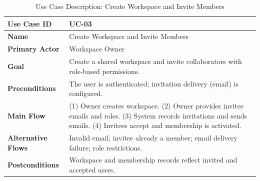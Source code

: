 \begin{table}[H]
    \centering
    \small
    \begin{tabularx}{\textwidth}{|l|X|}
        \hline
        \textbf{Use Case ID}       & UC-03                                                                                                                                                                       \\
        \hline
        \textbf{Name}              & Create Workspace and Invite Members                                                                                                                                         \\
        \hline
        \textbf{Primary Actor}     & Workspace Owner                                                                                                                                                             \\
        \hline
        \textbf{Goal}              & Create a shared workspace and invite collaborators with role-based permissions.                                                                                             \\
        \hline
        \textbf{Preconditions}     & The user is authenticated; invitation delivery (email) is configured.                                                                                                       \\
        \hline
        \textbf{Main Flow}         & (1) Owner creates workspace. (2) Owner provides invitee emails and roles. (3) System records invitations and sends emails. (4) Invitees accept and membership is activated. \\
        \hline
        \textbf{Alternative Flows} & Invalid email; invitee already a member; email delivery failure; role restrictions.                                                                                         \\
        \hline
        \textbf{Postconditions}    & Workspace and membership records reflect invited and accepted users.                                                                                                        \\
        \hline
    \end{tabularx}
    \caption{Use Case Description: Create Workspace and Invite Members}
    \label{tab:srs-uc-03}
\end{table}

